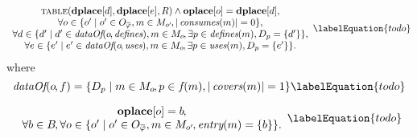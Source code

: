 \begin{equation}
  \begin{array}{c}
    \mTable(\mVar{dplace}[d], \mVar{dplace}[e], \mDomMatrix)
    \mAnd
    \mVar{oplace}[o] = \mVar{dplace}[d], \\
    \forall o \in
      \mSetBuilder{o'}%
                  {%
                    o' \in \mOpCompSet{\mPhi},
                    m \in \mMatchSet[o'] \hspace{-1pt},
                    \mCard{\mConsumes(m)} = 0
                  }, \\
    \forall d \in
      \mSetBuilder{d'}%
                  {%
                    d' \in \mDataOf(o \hspace{-1pt}, \mDefines),
                    m \in \mMatchSet[o] \hspace{-1pt},
                    \exists p \in \mDefines(m),
                    \mDataSet[p] = \mSet{d'}
                  }, \\
    \forall e \in
      \mSetBuilder{e'}%
                  {%
                    e' \in \mDataOf(o \hspace{-1pt}, \mUses),
                    m \in \mMatchSet[o] \hspace{-1pt},
                    \exists p \in \mUses(m),
                    \mDataSet[p] = \mSet{e'}
                  }.
  \end{array}
  \labelEquation{todo}
\end{equation}
%
where
%
\begin{equation}
  \mDataOf(o \hspace{-1pt}, f) =
  \mSetBuilder{\mDataSet[p]}%
              {%
                m \in \mMatchSet[o] \hspace{-1pt},
                p \in f\hspace{-1pt}(m),
                \mCard{\mCovers(m)} = 1
              }
  \labelEquation{todo}
\end{equation}



\begin{equation}
  \begin{array}{c}
    \mVar{oplace}[o] = b \hspace{-.8pt}, \\
    \forall b \in \mBlockSet \hspace{-1pt},
    \forall o \in
      \mSetBuilder{o'}%
                  {%
                    o' \in \mOpCompSet{\mPhi},
                    m \in \mMatchSet[o'] \hspace{-1pt},
                    \mEntry(m) = \mSet{b}
                  }.
  \end{array}
  \labelEquation{todo}
\end{equation}

